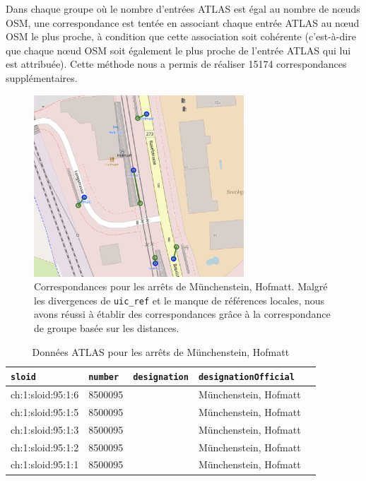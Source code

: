 Dans chaque groupe où le nombre d'entrées ATLAS est égal au nombre de nœuds OSM, une correspondance est tentée en associant chaque entrée ATLAS au nœud OSM le plus proche, à condition que cette association soit cohérente (c'est-à-dire que chaque nœud OSM soit également le plus proche de l'entrée ATLAS qui lui est attribuée). Cette méthode nous a permis de réaliser 15174 correspondances supplémentaires.

\begin{figure}[h] 
    \centering
    \includegraphics[width=0.7\textwidth]{../figures/correspondances/groupe_proximite.png}
    \caption[Correspondances – Münchenstein, Hofmatt]{Correspondances pour les arrêts de Münchenstein, Hofmatt. Malgré les divergences de \texttt{uic\_ref} et le manque de références locales, nous avons réussi à établir des correspondances grâce à la correspondance de groupe basée sur les distances.}
    \label{fig:group_proximity_munchenstein}
\end{figure}

\FloatBarrier

\begin{table}
\caption[Données ATLAS – Münchenstein, Hofmatt]{Données ATLAS pour les arrêts de Münchenstein, Hofmatt}
\label{tab:atlas_data}
\centering
\begin{tabular}{l l l l l}
\toprule
\texttt{sloid} & \texttt{number} & \texttt{designation} & \texttt{designationOfficial} \\
\midrule
ch:1:sloid:95:1:6 & 8500095 &  & Münchenstein, Hofmatt \\
ch:1:sloid:95:1:5 & 8500095 &  & Münchenstein, Hofmatt \\
ch:1:sloid:95:1:3 & 8500095 &  & Münchenstein, Hofmatt \\
ch:1:sloid:95:1:2 & 8500095 &  & Münchenstein, Hofmatt \\
ch:1:sloid:95:1:1 & 8500095 &  & Münchenstein, Hofmatt \\
\bottomrule
\end{tabular}
\end{table}

